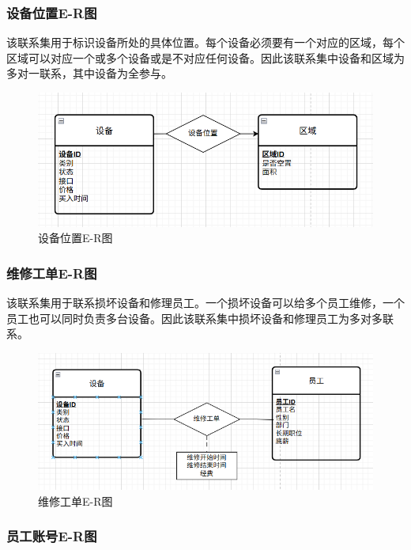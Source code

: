 \documentclass[]{article}
\let\oldincludegraphics\includegraphics
\renewcommand{\includegraphics}[2][]{%
  \begin{center}\oldincludegraphics[#1]{#2}\end{center}%
}
\begin{document}
\hypertarget{ux8bbeux5907ux4f4dux7f6ee-rux56fe}{%
\subsubsection{设备位置E-R图}\label{ux8bbeux5907ux4f4dux7f6ee-rux56fe}}

该联系集用于标识设备所处的具体位置。每个设备必须要有一个对应的区域，每个区域可以对应一个或多个设备或是不对应任何设备。因此该联系集中设备和区域为多对一联系，其中设备为全参与。

\begin{figure}[htbp]
\centering
\includegraphics{image8.png}
\caption{设备位置E-R图}
\end{figure}

\hypertarget{ux7ef4ux4feeux5de5ux5355e-rux56fe}{%
\subsubsection{维修工单E-R图}\label{ux7ef4ux4feeux5de5ux5355e-rux56fe}}

该联系集用于联系损坏设备和修理员工。一个损坏设备可以给多个员工维修，一个员工也可以同时负责多台设备。因此该联系集中损坏设备和修理员工为多对多联系。

\begin{figure}[htbp]
\centering
\includegraphics{image9.png}
\caption{维修工单E-R图}
\end{figure}

\hypertarget{ux5458ux5de5ux8d26ux53f7e-rux56fe}{%
\subsubsection{员工账号E-R图}\label{ux5458ux5de5ux8d26ux53f7e-rux56fe}}
\end{document}
